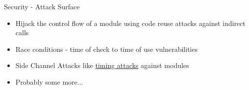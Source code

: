 \documentclass{beamer}
\begin{document}
\begin{frame}{Security - Attack Surface}
    \begin{itemize}
        \item Hijack the control flow of a module using code reuse attacks against indirect calls
        \item Race conditions - time of check to time of use vulnerabilities 
        \item Side Channel Attacks like \href{https://github.com/tc39/ecmascript_sharedmem/blob/master/issues/TimingAttack.md}{timing attacks} against modules
        \item Probably some more... 
    \end{itemize}
\end{frame}

\end{document}
